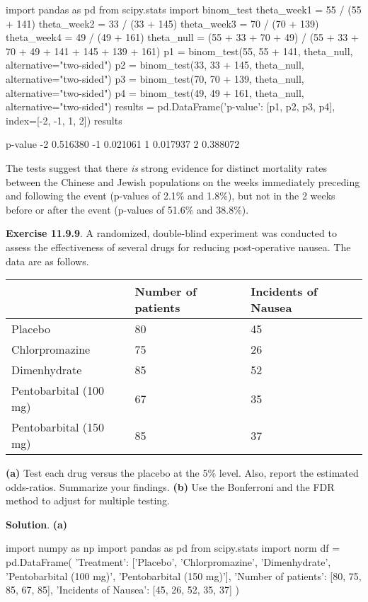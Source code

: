 \begin{python}
import pandas as pd
from scipy.stats import binom_test
theta_week1 = 55 / (55 + 141)
theta_week2 = 33 / (33 + 145)
theta_week3 = 70 / (70 + 139)
theta_week4 = 49 / (49 + 161)
theta_null = (55 + 33 + 70 + 49) / (55 + 33 + 70 + 49 + 141 + 145 + 139 + 161)
p1 = binom_test(55, 55 + 141, theta_null, alternative="two-sided")
p2 = binom_test(33, 33 + 145, theta_null, alternative="two-sided")
p3 = binom_test(70, 70 + 139, theta_null, alternative="two-sided")
p4 = binom_test(49, 49 + 161, theta_null, alternative="two-sided")
results = pd.DataFrame({'p-value': [p1, p2, p3, p4]}, index=[-2, -1, 1, 2])
results
\end{python}
\begin{console}
     p-value
-2  0.516380
-1  0.021061
 1  0.017937
 2  0.388072
\end{console}
The tests suggest that there \emph{is} strong evidence for distinct
mortality rates between the Chinese and Jewish populations on the weeks
immediately preceding and following the event (p-values of 2.1\% and
1.8\%), but not in the 2 weeks before or after the event (p-values of
51.6\% and 38.8\%).

\textbf{Exercise 11.9.9}. A randomized, double-blind experiment was
conducted to assess the effectiveness of several drugs for reducing
post-operative nausea. The data are as follows.
\begin{table}[H]
\centering
\begin{tabular}{@{}lll@{}}
\toprule
& Number of patients & Incidents of Nausea \\
\midrule
Placebo & 80 & 45 \\
Chlorpromazine & 75 & 26 \\
Dimenhydrate & 85 & 52 \\
Pentobarbital (100 mg) & 67 & 35 \\
Pentobarbital (150 mg) & 85 & 37 \\
\bottomrule
\end{tabular}
\end{table}
\textbf{(a)} Test each drug versus the placebo at the 5\% level. Also,
report the estimated odds-ratios. Summarize your findings.
\textbf{(b)} Use the Bonferroni and the FDR method to adjust for
multiple testing.

\textbf{Solution}.
\textbf{(a)}

\begin{python}
import numpy as np
import pandas as pd
from scipy.stats import norm
df = pd.DataFrame({
    'Treatment': ['Placebo', 'Chlorpromazine', 'Dimenhydrate', 
                  'Pentobarbital (100 mg)', 'Pentobarbital (150 mg)'],
    'Number of patients': [80, 75, 85, 67, 85],
    'Incidents of Nausea': [45, 26, 52, 35, 37]
})
\end{python}

